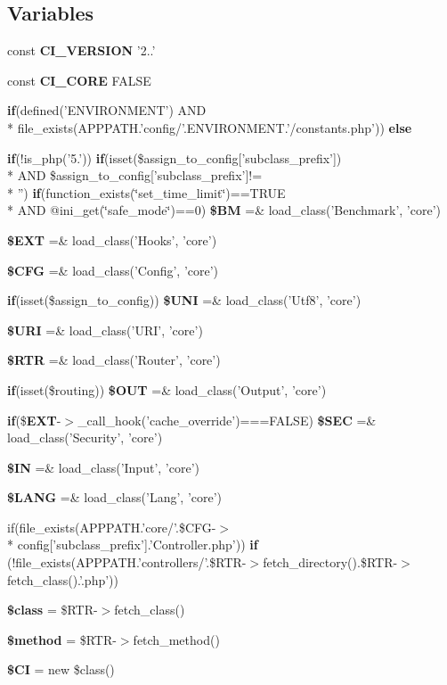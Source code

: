 \subsection*{Variables}
\begin{DoxyCompactItemize}
\item 
const {\bf C\-I\-\_\-\-V\-E\-R\-S\-I\-O\-N} '2..'
\item 
const {\bf C\-I\-\_\-\-C\-O\-R\-E} F\-A\-L\-S\-E
\item 
{\bf if}(defined('E\-N\-V\-I\-R\-O\-N\-M\-E\-N\-T') A\-N\-D \\*
file\-\_\-exists(A\-P\-P\-P\-A\-T\-H.'config/'.E\-N\-V\-I\-R\-O\-N\-M\-E\-N\-T.'/constants.\-php')) {\bf else}
\item 
{\bf if}(!is\-\_\-php('5.')) {\bf if}(isset(\$assign\-\_\-to\-\_\-config['subclass\-\_\-prefix']) \\*
A\-N\-D \$assign\-\_\-to\-\_\-config['subclass\-\_\-prefix']!= \\*
'') {\bf if}(function\-\_\-exists(\char`\"{}set\-\_\-time\-\_\-limit\char`\"{})==T\-R\-U\-E \\*
A\-N\-D @ini\-\_\-get(\char`\"{}safe\-\_\-mode\char`\"{})==0) {\bf \$\-B\-M} =\& load\-\_\-class('Benchmark', 'core')
\item 
{\bf \$\-E\-X\-T} =\& load\-\_\-class('Hooks', 'core')
\item 
{\bf \$\-C\-F\-G} =\& load\-\_\-class('Config', 'core')
\item 
{\bf if}(isset(\$assign\-\_\-to\-\_\-config)) {\bf \$\-U\-N\-I} =\& load\-\_\-class('Utf8', 'core')
\item 
{\bf \$\-U\-R\-I} =\& load\-\_\-class('U\-R\-I', 'core')
\item 
{\bf \$\-R\-T\-R} =\& load\-\_\-class('Router', 'core')
\item 
{\bf if}(isset(\$routing)) {\bf \$\-O\-U\-T} =\& load\-\_\-class('Output', 'core')
\item 
{\bf if}(\${\bf E\-X\-T}-\/$>$\-\_\-call\-\_\-hook('cache\-\_\-override')===F\-A\-L\-S\-E) {\bf \$\-S\-E\-C} =\& load\-\_\-class('Security', 'core')
\item 
{\bf \$\-I\-N} =\& load\-\_\-class('Input', 'core')
\item 
{\bf \$\-L\-A\-N\-G} =\& load\-\_\-class('Lang', 'core')
\item 
if(file\-\_\-exists(A\-P\-P\-P\-A\-T\-H.'core/'.\$C\-F\-G-\/$>$\\*
config['subclass\-\_\-prefix'].'Controller.\-php')) {\bf if} (!file\-\_\-exists(A\-P\-P\-P\-A\-T\-H.'controllers/'.\$R\-T\-R-\/$>$fetch\-\_\-directory().\$R\-T\-R-\/$>$fetch\-\_\-class().'.php'))
\item 
{\bf \$class} = \$R\-T\-R-\/$>$fetch\-\_\-class()
\item 
{\bf \$method} = \$R\-T\-R-\/$>$fetch\-\_\-method()
\item 
{\bf \$\-C\-I} = new \$class()
\end{DoxyCompactItemize}


